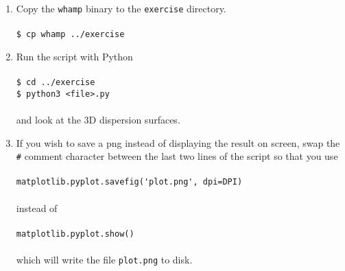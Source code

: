 \documentclass[a4paper,10pt]{article}
\begin{document}
\begin{enumerate}
   \item Copy the \verb=whamp= binary to the \verb=exercise= directory. \\ \\
   \verb=$ cp whamp ../exercise=
   
   \item Run the script with Python \\ \\
   \verb=$ cd ../exercise= \\
   \verb=$ python3 <file>.py= \\ \\
   and look at the 3D dispersion surfaces.
   
   \item If you wish to save a png instead of displaying the result on screen, swap the \verb=#= comment character between the last two lines of the
script so that you use \\ \\
   \verb+matplotlib.pyplot.savefig('plot.png', dpi=DPI)+ \\ \\
   instead of \\ \\
   \verb=matplotlib.pyplot.show()= \\ \\
   which will write the file \verb=plot.png= to disk.
\end{enumerate}
\end{document}
